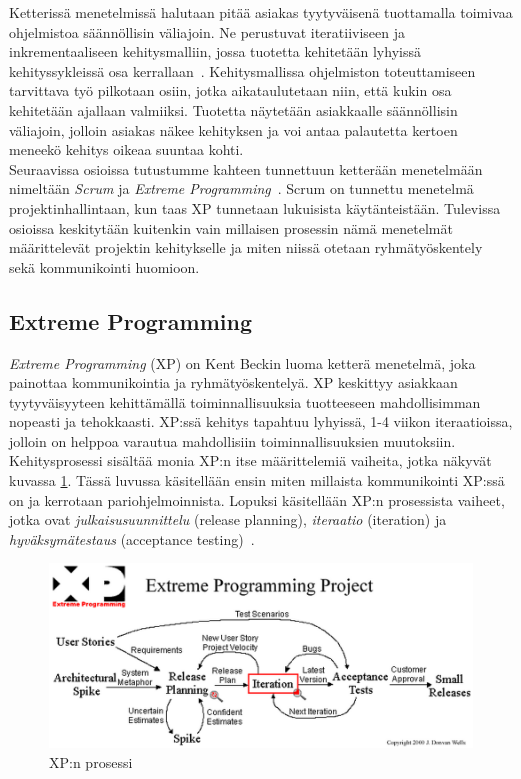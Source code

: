 \documentclass[finnish]{../tktltiki2}
\theoremstyle{definition}
\theoremstyle{remark}
\begin{document}
Ketterissä menetelmissä halutaan pitää asiakas tyytyväisenä tuottamalla toimivaa
ohjelmistoa säännöllisin väliajoin. Ne perustuvat iteratiiviseen ja inkrementaaliseen kehitysmalliin, jossa tuotetta kehitetään lyhyissä kehityssykleissä osa kerrallaan~\cite{Cockburn:2008}. Kehitysmallissa ohjelmiston toteuttamiseen tarvittava työ pilkotaan osiin, jotka aikataulutetaan niin, että kukin osa kehitetään ajallaan valmiiksi. Tuotetta näytetään asiakkaalle säännöllisin väliajoin, jolloin asiakas näkee kehityksen ja voi antaa palautetta kertoen meneekö kehitys oikeaa suuntaa kohti.\\

Seuraavissa osioissa tutustumme kahteen tunnettuun
ketterään menetelmään nimeltään \emph{Scrum} ja \emph{Extreme Programming}~\cite{ScrumFinnishGuide,Beck:2004:EPE:1076267,Scrumprimer,ScrumHandBook}. Scrum on tunnettu menetelmä projektinhallintaan, kun taas XP tunnetaan lukuisista käytänteistään. Tulevissa osioissa keskitytään kuitenkin vain millaisen prosessin nämä menetelmät
määrittelevät projektin kehitykselle ja miten niissä otetaan ryhmätyöskentely sekä kommunikointi huomioon.

\subsection{Extreme Programming}

\emph{Extreme Programming} (XP) on Kent Beckin luoma ketterä menetelmä, joka painottaa kommunikointia ja ryhmätyöskentelyä. XP keskittyy asiakkaan tyytyväisyyteen kehittämällä toiminnallisuuksia
tuotteeseen mahdollisimman nopeasti ja tehokkaasti. XP:ssä kehitys tapahtuu lyhyissä, 1-4 viikon iteraatioissa, jolloin on helppoa varautua mahdollisiin
toiminnallisuuksien muutoksiin. Kehitysprosessi sisältää monia XP:n itse määrittelemiä vaiheita, jotka
näkyvät kuvassa \ref{xprocess}. Tässä luvussa käsitellään ensin miten millaista kommunikointi XP:ssä on ja kerrotaan pariohjelmoinnista. Lopuksi
käsitellään XP:n prosessista vaiheet, jotka ovat \emph{julkaisusuunnittelu} (release planning), \emph{iteraatio} (iteration) ja \emph{hyväksymätestaus} (acceptance testing)~\cite{XP.ORG}.

\begin{figure}[ht]
     \includegraphics[width=12cm]{xp.png}
     \caption{XP:n prosessi~\cite{XP.ORGMAP}}\label{xprocess}
\end{figure}
\end{document}
